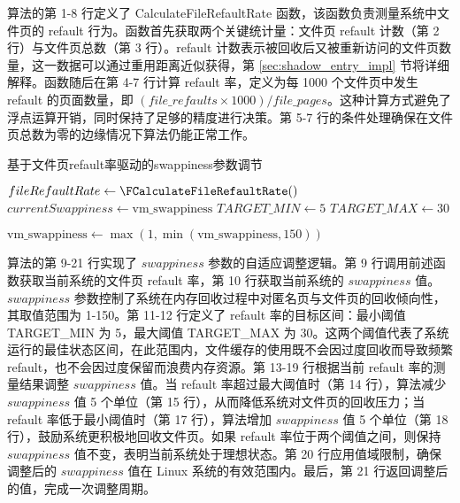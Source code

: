 算法的第 1-8 行定义了 CalculateFileRefaultRate 函数，该函数负责测量系统中文件页的 refault 行为。函数首先获取两个关键统计量：文件页 refault 计数（第 2 行）与文件页总数（第 3 行）。refault 计数表示被回收后又被重新访问的文件页数量，这一数据可以通过重用距离近似获得，第 \ref{sec:shadow_entry_impl} 节将详细解释。函数随后在第 4-7 行计算 refault 率，定义为每 1000 个文件页中发生 refault 的页面数量，即 \((file\_refaults \times 1000) / file\_pages\)。这种计算方式避免了浮点运算开销，同时保持了足够的精度进行决策。第 5-7 行的条件处理确保在文件页总数为零的边缘情况下算法仍能正常工作。
\begin{algorithm}[H]
  \caption{基于文件页refault率驱动的swappiness参数调节}
  \label{alg:swappiness1}
  
  
  \(fileRefaultRate \gets \FCalculateFileRefaultRate()\) \;
  \(currentSwappiness \gets \text{vm\_swappiness}\) \;  %
  \(TARGET\_MIN \gets 5\) \;
  \(TARGET\_MAX \gets 30\) \;
  
  \(\text{vm\_swappiness} \gets \max(1, \min(\text{vm\_swappiness}, 150))\) \;
\end{algorithm}

算法的第 9-21 行实现了 \(swappiness\) 参数的自适应调整逻辑。第 9 行调用前述函数获取当前系统的文件页 refault 率，第 10 行获取当前系统的 \(swappiness\) 值。\(swappiness\) 参数控制了系统在内存回收过程中对匿名页与文件页的回收倾向性，其取值范围为 1-150。第 11-12 行定义了 refault 率的目标区间：最小阈值 TARGET\_MIN 为 5，最大阈值 TARGET\_MAX 为 30。这两个阈值代表了系统运行的最佳状态区间，在此范围内，文件缓存的使用既不会因过度回收而导致频繁 refault，也不会因过度保留而浪费内存资源。第 13-19 行根据当前 refault 率的测量结果调整 \(swappiness\) 值。当 refault 率超过最大阈值时（第 14 行），算法减少 \(swappiness\) 值 5 个单位（第 15 行），从而降低系统对文件页的回收压力；当 refault 率低于最小阈值时（第 17 行），算法增加 \(swappiness\) 值 5 个单位（第 18 行），鼓励系统更积极地回收文件页。如果 refault 率位于两个阈值之间，则保持 \(swappiness\) 值不变，表明当前系统处于理想状态。第 20 行应用值域限制，确保调整后的 \(swappiness\) 值在 Linux 系统的有效范围内。最后，第 21 行返回调整后的值，完成一次调整周期。

